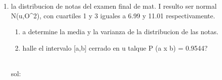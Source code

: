 \documentclass[12pt,a4paper,openany]{article}
\begin{document}
	\begin{enumerate}
		\item la distribucion de notas del examen final de mat. I resulto ser normal N(u,O^2), con cuartiles 1 y 3 iguales a 6.99 y 11.01 respectivamente.
		\begin{enumerate}[a]
			\item a determine la media y la varianza de la distribucion de las notas.
			\item halle el intervalo [a,b] cerrado en u talque P (a \le x \le b) = 0.9544?
		\end{enumerate}
		\\
		sol:
	\end{enumerate}
\end{document}
